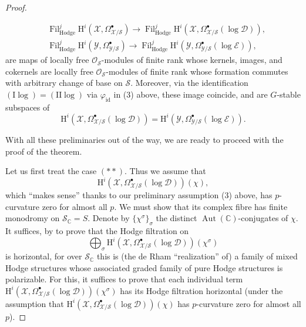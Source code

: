 \begin{proof}
\begin{enumerate}[label=(\arabic*)]
\[
\begin{aligned}
&\operatorname{Fil}^j_{\mathrm{Hodge}}\mathrm{H}^i(\mathcal{X},\Omega^\bullet_{\mathcal{X}/\mathcal{S}})
\to\operatorname{Fil}^j_{\mathrm{Hodge}}\mathrm{H}^i(\mathcal{X},\Omega^\bullet_{\mathcal{X}/\mathcal{S}}(\log\mathcal{D})),\\
&\operatorname{Fil}^j_{\mathrm{Hodge}}\mathrm{H}^i(\mathcal{Y},\Omega^\bullet_{\mathcal{Y}/\mathcal{S}})
\to\operatorname{Fil}^j_{\mathrm{Hodge}}\mathrm{H}^i(\mathcal{Y},\Omega^\bullet_{\mathcal{Y}/\mathcal{S}}(\log\mathcal{E})),
\end{aligned}
\]
are maps of locally free \(\mathcal{O}_{\mathcal{S}}\)-modules of finite rank whose kernels, images, and cokernels are locally free \(\mathcal{O}_{\mathcal{S}}\)-modules of finite rank whose formation commutes with arbitrary change of base on \(\mathcal{S}\). Moreover, via the identification \((\mathrm{I}\log)=(\mathrm{II}\log)\) via \(\varphi_{\mathrm{id}}\) in (3) above, these image coincide, and are \(G\)-stable subspaces of
\[
\mathrm{H}^i(\mathcal{X},\Omega^\bullet_{\mathcal{X}/\mathcal{S}}(\log\mathcal{D}))=\mathrm{H}^i(\mathcal{Y},\Omega^\bullet_{\mathcal{Y}/\mathcal{S}}(\log\mathcal{E})).
\]
\end{enumerate}

With all these preliminaries out of the way, we are ready to proceed with the proof of the theorem.

Let us first treat the case \((**)\). Thus we assume that
\[
\mathrm{H}^i(\mathcal{X},\Omega^\bullet_{\mathcal{X}/\mathcal{S}}(\log\mathcal{D}))(\chi),
\]
which ``makes sense'' thanks to our preliminary assumption (3) above, has \(p\)-curvature zero for almost all \(p\). We must show that its complex fibre has finite monodromy on \(\mathcal{S}_{\mathbb{C}}=S\). Denote by \(\{\chi^\sigma\}_\sigma\) the distinct \(\operatorname{Aut}(\mathbb{C})\)-conjugates of \(\chi\). It suffices, by \cite[4.2.2.3]{Ka-ASDE} to prove that the Hodge filtration on
\[
\bigoplus_\sigma \mathrm{H}^i(\mathcal{X},\Omega^\bullet_{\mathcal{X}/\mathcal{S}}(\log\mathcal{D}))(\chi^\sigma)
\]
is horizontal, for over \(\mathcal{S}_{\mathbb{C}}\) this is (the de Rham ``realization'' of) a family of mixed Hodge structures whose associated graded family of pure Hodge structures is polarizable. For this, it suffices to prove that each individual term \(\mathrm{H}^i(\mathcal{X},\Omega^\bullet_{\mathcal{X}/\mathcal{S}}(\log\mathcal{D}))(\chi^\sigma)\) has its Hodge filtration horizontal (under the assumption that \(\mathrm{H}^i(\mathcal{X},\Omega^\bullet_{\mathcal{X}/\mathcal{S}}(\log\mathcal{D}))(\chi)\) has \(p\)-curvature zero for almost all \(p\)).


\end{proof}
